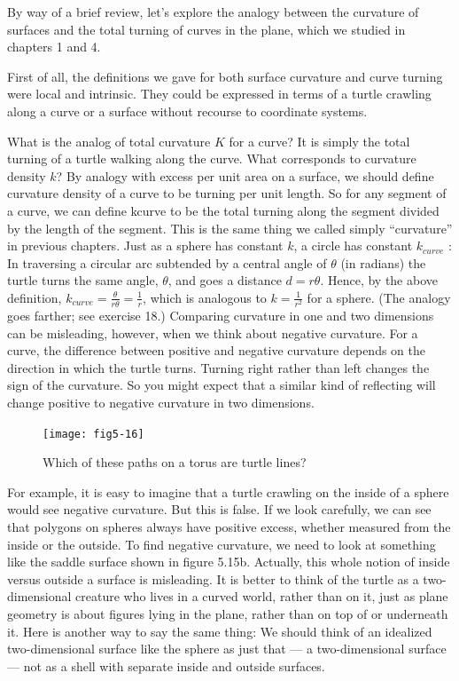 \documentclass{book}
\begin{document}
By way of a brief review, let's explore the analogy between the curvature
of surfaces and the total turning of curves in the plane, which we studied
in chapters 1 and 4.

First of all, the definitions we gave for both surface curvature and
curve turning were local and intrinsic. They could be expressed in
terms of a turtle crawling along a curve or a surface without recourse to
coordinate systems.

What is the analog of total curvature $K$ for a curve? It is simply the
total turning of a turtle walking along the curve. What corresponds to
curvature density $k$? By analogy with excess per unit area on a surface,
we should define curvature density of a curve to be turning per unit
length. So for any segment of a curve, we can define kcurve to be the
total turning along the segment divided by the length of the segment.
This is the same thing we called simply ``curvature'' in previous chapters.
Just as a sphere has constant $k$, a circle has constant $k_{curve}$ : In
traversing a circular arc subtended by a central angle of $\theta$ (in radians)
the turtle turns the same angle, $\theta$, and goes a distance $d = r\theta$. Hence,
by the above definition, $k_{curve} = \frac{\theta}  {r \theta} = \frac {1} {r}$, which is analogous to
$k = \frac {1} {r^2}$ for a sphere. (The analogy goes farther; see exercise 18.)
Comparing curvature in one and two dimensions can be misleading,
however, when we think about negative curvature. For a curve, the
difference between positive and negative curvature depends on the direction in which the turtle turns. Turning right rather than left changes
the sign of the curvature. So you might expect that a similar kind of
reflecting will change positive to negative curvature in two dimensions.

\begin{figure}
\begin{center}
\texttt{[image: fig5-16]}
\caption{Which of these paths on a torus are turtle lines?}
\end{center}
\end{figure}


For example, it is easy to imagine that a turtle crawling on the inside
of a sphere would see negative curvature. But this is false. If we look
carefully, we can see that polygons on spheres always have positive excess, whether measured from the inside or the outside. To find negative
curvature, we need to look at something like the saddle surface shown in
figure 5.15b. Actually, this whole notion of inside versus outside a surface is misleading. It is better to think of the turtle as a two-dimensional
creature who lives in a curved world, rather than on it, just as plane
geometry is about figures lying in the plane, rather than on top of or underneath it. Here is another way to say the same thing: We should think
of an idealized two-dimensional surface like the sphere as just that --- a
two-dimensional surface --- not as a shell with separate inside and outside
surfaces.
\end{document}
